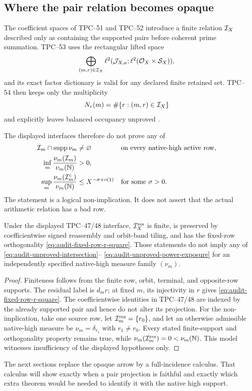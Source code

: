\subsection{Where the pair relation becomes opaque}

The coefficient spaces of TPC--51 and TPC--52 introduce a finite relation
\(\mathcal I_X\) described only as containing the supported pairs before coherent
prime summation.  TPC--53 uses the rectangular lifted space
\begin{equation}
 \bigoplus_{(m,r)\in\mathcal I_X}
 \ell^2(\mathcal J_{X,a};\ell^2(\mathcal O_X\times\mathcal S_X)),
 \label{eq:audit-rectangular-space}
\end{equation}
and its exact factor dictionary is valid for any declared finite retained
set.  TPC--54 then keeps only the multiplicity
\begin{equation}
 N_r(m)=\#\{r:(m,r)\in\mathcal I_X\}
 \label{eq:audit-row-multiplicity}
\end{equation}
and explicitly leaves balanced occupancy unproved
\citep{WangTPC51,WangTPC52,WangTPC53,WangTPC54}.

The displayed interfaces therefore do not prove any of
\begin{align}
 \mathcal I_m\cap\operatorname{supp}\nu_m&\ne\varnothing
       &&\text{on every native-high active row},
 \label{eq:audit-unproved-intersection}\\
 \inf_m\frac{\nu_m(\mathcal I_m)}{\nu_m(\mathbb N)}&>0,
 \label{eq:audit-unproved-positive-exposure}\\
 \sup_m\frac{\nu_m(\mathcal I_m^c)}{\nu_m(\mathbb N)}
 &\le X^{-\sigma+o(1)}
       &&\text{for some \(\sigma>0\)}.
 \label{eq:audit-unproved-power-exposure}
\end{align}
The statement is a logical non-implication.  It does not assert that the
actual arithmetic relation has a bad row.

\begin{proposition}
\label{prop:audit-support-preservation-boundary}
Under the displayed TPC--47/48 interface, \(\mathcal I_X^{\rm res}\) is finite,
is preserved by coefficientwise signed reassembly and orbit-band tiling,
and has the fixed-row orthogonality \eqref{eq:audit-fixed-row-r-square}.
Those statements do not imply any of
\eqref{eq:audit-unproved-intersection}--
\eqref{eq:audit-unproved-power-exposure} for an independently specified
native-high measure family \((\nu_m)\).
\end{proposition}

\begin{proof}
Finiteness follows from the finite row, orbit, terminal, and opposite-row
supports.  The residual label is \(d_mr\); at fixed \(m\), its injectivity
in \(r\) gives \eqref{eq:audit-fixed-row-r-square}.  The coefficientwise
identities in TPC--47/48 are indexed by the already supported pair and hence
do not alter its projection.  For the non-implication, take one source row,
let \(\mathcal I_m^{\rm res}=\{r_0\}\), and let an otherwise admissible native-high
measure be \(\nu_m=\delta_{r_1}\) with \(r_1\ne r_0\).  Every stated
finite-support and orthogonality property remains true, while
\(\nu_m(\mathcal I_m^{\rm res})=0<\nu_m(\mathbb N)\).  This model witnesses
insufficiency of the displayed hypotheses only.
\end{proof}

The next sections replace the opaque arrow by a full-incidence calculus.
That calculus will show exactly when a pair projection is faithful and
exactly which extra theorem would be needed to identify it with the native
high support.
